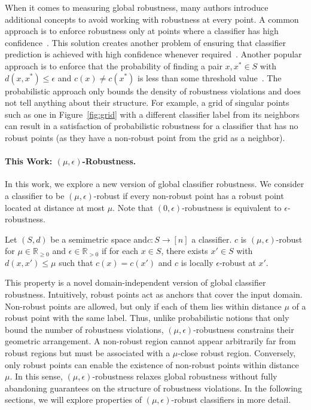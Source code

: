 When it comes to measuring global robustness, many authors introduce additional concepts to avoid working with robustness at every point. A common approach is to enforce robustness only at points where a classifier has high confidence~\cite{athavale2024verifying,leino2021globally}. This solution creates another problem of ensuring that classifier prediction is achieved with high confidence whenever required~\cite{el2010foundations,chow1970optimum}. Another popular approach is to enforce that the probability of finding a pair $x, x^*\in S$ with $d(x,x^*) \leq \epsilon$ and $c(x) \neq c(x^*)$ is less than some threshold value~\cite{levy2023groma,li2024certifying,mangal2019robustness}. The probabilistic approach only bounds the density of robustness violations and does not tell anything about their structure. For example, a grid of singular points such as one in Figure~\ref{fig:grid} with a different classifier label from its neighbors can result in a satisfaction of probabilistic robustness for a classifier that has no robust points (as they have a non-robust point from the grid as a neighbor).

\paragraph{This Work: $(\mu,\epsilon)$-Robustness.} In this work, we explore a new version of global classifier robustness. We consider a classifier to be $(\mu,\epsilon)$-robust if every non-robust point has a robust point located at distance at most $\mu$. Note that $(0,\epsilon)$-robustness is equivalent to $\epsilon$-robustness.
\begin{definition}
\label{def:mueps}
Let $(S,d)$ be a semimetric space and\linebreak $c: S \rightarrow [n]$ a classifier. $c$ is $(\mu, \epsilon)$-robust for $\mu \in \mathbb{R}_{\geq0}$ and $\epsilon \in \mathbb{R}_{>0}$ if for each $x \in S$, there exists $x' \in S$ with $d(x,x') \leq \mu$ such that $c(x) = c(x')$ and $c$ is locally $\epsilon$-robust at $x'$.
\end{definition}

This property is a novel domain-independent version of global classifier robustness. Intuitively, robust points act as anchors that cover the input domain. Non-robust points are allowed, but only if each of them lies within distance $\mu$ of a robust point with the same label. Thus, unlike probabilistic notions that only bound the number of robustness violations, $(\mu,\epsilon)$-robustness constrains their geometric arrangement. A non-robust region cannot appear arbitrarily far from robust regions but must be associated with a $\mu$-close robust region. Conversely, only robust points can enable the existence of non-robust points within distance $\mu$. In this sense, $(\mu,\epsilon)$-robustness relaxes global robustness without fully abandoning guarantees on the structure of robustness violations. In the following sections, we will explore properties of $(\mu,\epsilon)$-robust classifiers in more detail.